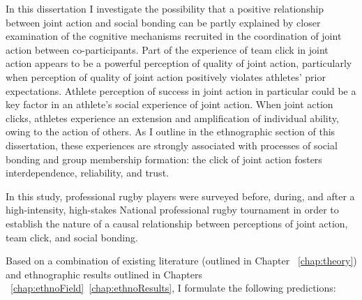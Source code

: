 \begin{CJK}{UTF8}{gbsn}
In this dissertation I investigate the possibility that a positive relationship between joint action and social bonding can be partly explained by closer examination of the cognitive mechanisms recruited in the coordination of joint action between co-participants.  Part of the experience of team click in joint action appears to be a powerful perception of quality of joint action, particularly when perception of quality of joint action positively violates athletes' prior expectations.  Athlete perception of success in joint action in particular could be a key factor in an athlete's social experience of joint action.  When joint action clicks, athletes experience an extension and amplification of individual ability, owing to the action of others.  As I outline in the ethnographic section of this dissertation, these experiences are strongly associated with processes of social bonding and group membership formation: the click of joint action fosters interdependence, reliability, and trust.

In this study, professional rugby players were surveyed before, during, and after a high-intensity, high-stakes National professional rugby tournament in order to establish the nature of a causal relationship between perceptions of joint action, team click, and social bonding.

Based on a combination of existing literature (outlined in Chapter ~\ref{chap:theory}) and ethnographic results outlined in Chapters ~\ref{chap:ethnoField}\nobreakdash~\ref{chap:ethnoResults}, I formulate the following predictions:


\end{CJK}
